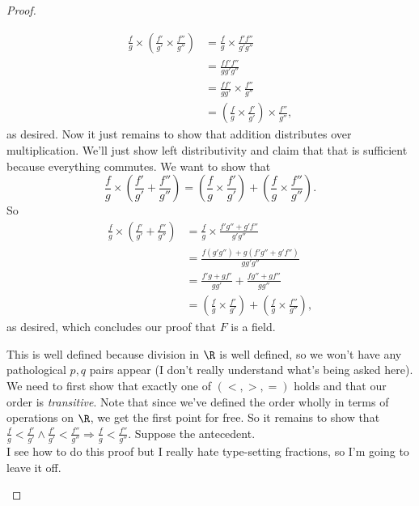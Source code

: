 \documentclass{assignment}
\begin{document}
\begin{proof}
\begin{qparts}
\begin{align*}
    \frac{f}{g} \times \left(\frac{f'}{g'} \times \frac{f''}{g''}\right) 
  &= \frac{f}{g} \times \frac{f'f''}{ g'g''} \\
  &= \frac{ff'f''}{gg'g''} \\
  &= \frac{ff'}{gg'} \times \frac{f''}{ g''} \\
  &= \left(\frac{f}{g} \times \frac{f'}{g'}\right) \times \frac{f''}{g''},
  \end{align*}
  as desired. Now it just remains to show that addition distributes over multiplication. We'll just show
  left distributivity and claim that that is sufficient because everything commutes. We want to show 
  that $$\frac{f}{g}\times\left(\frac{f'}{g'}+\frac{f''}{g''}\right) = \left(\frac{f}{g}\times\frac{f'}
  {g'}\right) + \left(\frac{f}{g}\times\frac{f''}{g''}\right).$$ So
  \begin{align*}
    \frac{f}{g}\times\left(\frac{f'}{g'}+\frac{f''}{g''}\right) 
    &= \frac{f}{g}\times\frac{f'g'' + g'f''}{g'g''} \\
    &= \frac{f(g'g'') + g(f'g'' + g'f'')}{gg'g''} \\
    &= \frac{f'g + gf'}{gg'} + \frac{fg'' + gf''}{gg''} \\
    &= \left(\frac{f}{g}\times\frac{f'}{g'}\right) + \left(\frac{f}{g}\times\frac{f''}{g''}\right),
  \end{align*}
  as desired, which concludes our proof that $F$ is a field.

  \item This is well defined because division in $\R$ is well defined, so we won't have any pathological
    $p,q$ pairs appear (I don't really understand what's being asked here).\\

    We need to first show that exactly one of $(<,>,=)$ holds and that our order is \emph{transitive}.
    Note that since we've defined the order wholly in terms of operations on $\R$, we get the first 
    point for free. So it remains to show that $\frac{f}{g} < \frac{f'}{g'} \wedge \frac{f'}{g'} <
    \frac{f''}{g''} \Rightarrow \frac{f}{g} < \frac{f''}{g''}$. Suppose the antecedent.\\

    I see how to do this proof but I really hate type-setting fractions, so I'm going to leave it off.


\end{qparts}
\end{proof}
\end{document}
